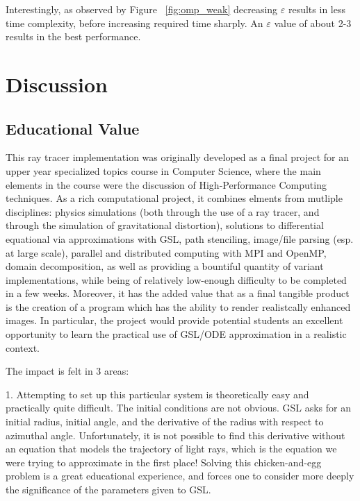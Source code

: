 Interestingly, as observed by Figure ~\ref{fig:omp_weak} decreasing $\varepsilon$ results in less time complexity, before increasing required time sharply. An $\varepsilon$ value of about 2-3 results in the best performance.






\section{Discussion}
\label{sec:disc}

\subsection{Educational Value}

This ray tracer implementation was originally developed as a final project for
an upper year specialized topics course in Computer Science, where the main
elements in the course were the discussion of High-Performance Computing
techniques.
As a rich computational project, it combines elments from mutliple disciplines:
physics simulations (both through the use of a ray tracer, and through the simulation of gravitational distortion),
solutions to differential equational via approximations with GSL,
path stenciling, image/file parsing (esp. at large scale),
parallel and distributed computing with MPI and OpenMP, domain decomposition,
as well as providing a bountiful quantity of variant implementations,
while being of relatively low-enough difficulty to be completed in a few weeks.
Moreover, it has the added value that as a final tangible product is the creation of
a program which has the ability to render realistcally enhanced images.
In particular, the project would provide potential students an excellent
opportunity to learn the practical use of GSL/ODE approximation in a realistic
context.

The impact is felt in 3 areas:

1. Attempting to set up this particular system is theoretically easy and practically quite difficult. The initial conditions are not obvious. GSL asks for an initial radius, initial angle, and the derivative of the radius with respect to azimuthal angle. Unfortunately, it is not possible to find this derivative without an equation that models the trajectory of light rays, which is the equation we were trying to approximate in the first place! Solving this chicken-and-egg problem is a great educational experience, and forces one to consider more deeply the significance of the parameters given to GSL. 

